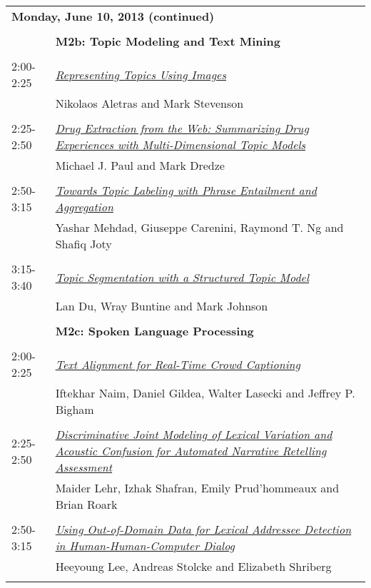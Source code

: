 \newpage
\begin{tabular}{p{20mm}p{138mm}}
\\
\multicolumn{2}{l}{\bf Monday, June 10, 2013
 (continued)} \\\\
 & {\bf M2b: Topic Modeling and Text Mining
} \\
\\
2:00-2:25 & \hyperlink{page.158}{\em Representing Topics Using Images}\\
         & Nikolaos Aletras and Mark Stevenson \\
\\

2:25-2:50 & \hyperlink{page.168}{\em Drug Extraction from the Web: Summarizing Drug Experiences with Multi-Dimensional Topic Models}\\
         & Michael J. Paul and Mark Dredze \\
\\

2:50-3:15 & \hyperlink{page.179}{\em Towards Topic Labeling with Phrase Entailment and Aggregation}\\
         & Yashar Mehdad, Giuseppe Carenini, Raymond T. Ng and Shafiq Joty \\
\\

3:15-3:40 & \hyperlink{page.190}{\em Topic Segmentation with a Structured Topic Model}\\
         & Lan Du, Wray Buntine and Mark Johnson \\
\\

 & {\bf M2c: Spoken Language Processing
} \\
\\
2:00-2:25 & \hyperlink{page.201}{\em Text Alignment for Real-Time Crowd Captioning}\\
         & Iftekhar Naim, Daniel Gildea, Walter Lasecki and Jeffrey P. Bigham \\
\\

2:25-2:50 & \hyperlink{page.211}{\em Discriminative Joint Modeling of Lexical Variation and Acoustic Confusion for Automated Narrative Retelling Assessment}\\
         & Maider Lehr, Izhak Shafran, Emily Prud'hommeaux and Brian Roark \\
\\

2:50-3:15 & \hyperlink{page.221}{\em Using Out-of-Domain Data for Lexical Addressee Detection in Human-Human-Computer Dialog}\\
         & Heeyoung Lee, Andreas Stolcke and Elizabeth Shriberg \\
\\


\end{tabular}
